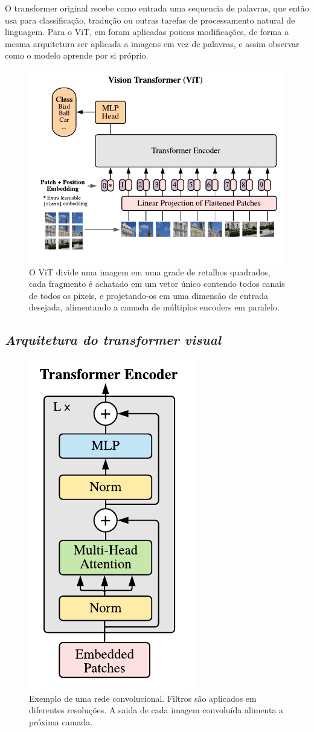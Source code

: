 O transformer original recebe como entrada uma sequencia de palavras, que então usa para classificação, tradução ou outras tarefas de processamento natural de linguagem. Para o ViT, em \cite{dosovitskiy2020image} foram aplicadas poucas modificações, de forma a mesma arquitetura ser aplicada a imagens em vez de palavras, e assim observar como o modelo aprende por si próprio.

\begin{figure}[!ht]
    \centering
    \includegraphics[width=0.9\columnwidth]{
        Imagens/vit.png
    }
    \caption{O ViT divide uma imagem em uma grade de retalhos quadrados, cada fragmento é achatado em um vetor único contendo todos canais de todos os pixeis, e projetando-os em uma dimensão de entrada desejada, alimentando a camada de múltiplos encoders em paralelo.}
    \label{fig:vit}
\end{figure}


\subsection{\textit{Arquitetura do transformer visual}}\label{sec:Cap2_vit}



\begin{figure}[!ht]
    \centering
    \includegraphics[width=0.3\columnwidth]{
        Imagens/encoder.png
    }
    \caption{Exemplo de uma rede convolucional. Filtros são aplicados em diferentes resoluções. A saida de cada imagem convoluída alimenta a próxima camada.}
    \label{fig:encoder}
\end{figure}



